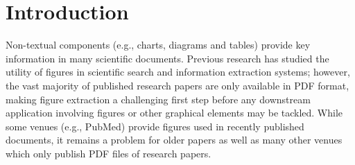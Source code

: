 \documentclass[sigconf]{acmart}
\begin{document}
%





\maketitle

\section{Introduction}%
Non-textual components (e.g., charts, diagrams and tables) provide key information in many scientific documents.
Previous research has studied the utility of figures in scientific search and information extraction systems; however, the vast majority of published research papers are only available in PDF format, making figure extraction a challenging first step before any downstream application involving figures or other graphical elements may be tackled.
While some venues (e.g., PubMed) provide figures used in recently published documents, it remains a problem for older papers as well as many other venues which only publish PDF files of research papers.
\end{document}
